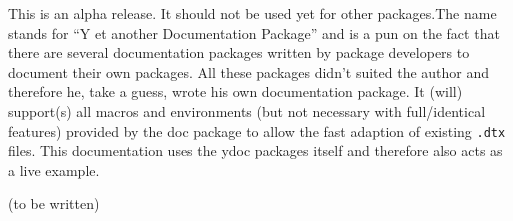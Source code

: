 This is an alpha release. It should not be used yet for other packages.The
name stands for “Y et another Documentation Package” and is a pun on the fact
that there are several documentation packages written by package developers
to document their own packages. All these packages didn’t suited the author
and therefore he, take a guess, wrote his own documentation package. It (will)
support(s) all macros and environments (but not necessary with full/identical
features) provided by the doc package to allow the fast adaption of existing
\texttt{.dtx} files.
This documentation uses the ydoc packages itself and therefore also acts as
a live example.

\begin{teXXX}
\begin{examplecode}(to be written)
\test \other \other
\end{examplecode}
\end{teXXX}
























